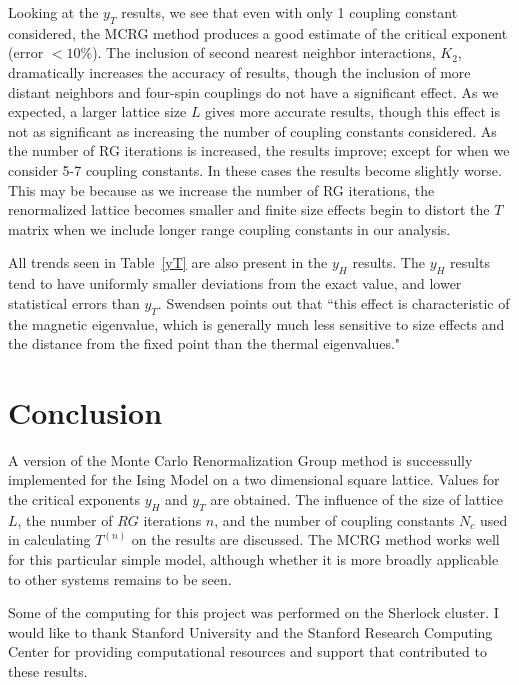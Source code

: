 \documentclass[12pt]{article}
\begin{document}
Looking at the $y_T$ results, we see that even with only 1 coupling constant considered, the MCRG method produces a good estimate of the critical exponent (error $< 10\%$). The inclusion of second nearest neighbor interactions, $K_2$, dramatically increases the accuracy of results, though the inclusion of more distant neighbors and four-spin couplings do not have a significant effect. As we expected, a larger lattice size $L$ gives more accurate results, though this effect is not as significant as increasing the number of coupling constants considered. As the number of RG iterations is increased, the results improve; except for when we consider 5-7 coupling constants. In these cases the results become slightly worse. This may be because as we increase the number of RG iterations, the renormalized lattice becomes smaller and finite size effects begin to distort the $T$ matrix when we include longer range coupling constants in our analysis.

All trends seen in Table~\ref{yT} are also present in the $y_H$ results. The $y_H$ results tend to have uniformly smaller deviations from the exact value, and lower statistical errors than $y_T$. Swendsen points out that ``this effect is characteristic of the magnetic eigenvalue, which is generally much less sensitive to size effects and the distance from the fixed point than the thermal eigenvalues."




\section{Conclusion}
A version of the Monte Carlo Renormalization Group method is successully implemented for the Ising Model on a two dimensional square lattice. Values for the critical exponents $y_H$ and $y_T$ are obtained. The influence of the size of lattice $L$, the number of $RG$ iterations $n$, and the number of coupling constants $N_c$ used in calculating $T^{(n)}$  on the results are discussed. The MCRG method works well for this particular simple model, although whether it is more broadly applicable to other systems remains to be seen. 

Some of the computing for this project was performed on the Sherlock cluster. I would like to thank Stanford University and the Stanford Research Computing Center for providing computational resources and support that contributed to these results.



\end{document}
